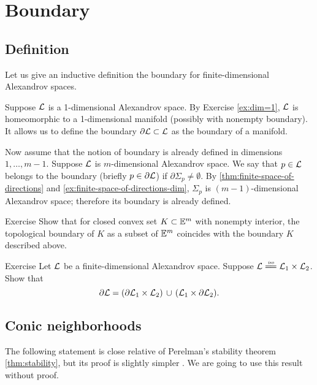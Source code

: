 \chapter{Boundary}\label{chap:bry}

\section{Definition}

Let us give an inductive definition the boundary for finite-dimensional Alexandrov spaces.

Suppose $\mathcal{L}$ is a 1-dimensional Alexandrov space.
By Exercise \ref{ex:dim=1},
$\mathcal{L}$ is homeomorphic to a 1-dimensional manifold (possibly with nonempty boundary).
It allows us to define the boundary $\partial\mathcal{L}\subset \mathcal{L}$ as the boundary of a manifold.

Now assume that the notion of boundary is already defined in dimensions $1,\dots,m-1$.
Suppose  $\mathcal{L}$ is $m$-dimensional Alexandrov space.
We say that $p\in \mathcal{L}$ belongs to the boundary (briefly $p\in \partial \mathcal{L}$) if 
$\partial\Sigma_p\ne\emptyset$.
By \ref{thm:finite-space-of-directions} and \ref{ex:finite-space-of-directions-dim}, $\Sigma_p$ is $(m-1)$-dimensional Alexandrov space;
therefore its boundary is already defined.

\begin{thm}{Exercise}\label{ex:bry-convex}
Show that for closed convex set $K\subset \mathbb{E}^m$ with nonempty interior, the topological boundary of $K$ as a subset of $\mathbb{E}^m$ coincides with the boundary $K$ described above.
\end{thm}

\begin{thm}{Exercise}\label{ex:bry-product}
Let $\mathcal{L}$ be a finite-dimensional Alexandrov space.
Suppose $\spc{L}\iso\spc{L}_1\times\spc{L}_2$.
Show that 
\[\partial \mathcal{L}=(\partial\mathcal{L}_1\times\mathcal{L}_2)\,\cup\,(\mathcal{L}_1\times\partial\mathcal{L}_2).\]
\end{thm}


\section{Conic neighborhoods}

The following statement is close relative of Perelman's stability theorem \ref{thm:stability}, but its proof is slightly simpler \cite{perelman:morse}.
We are going to use this result without proof.


